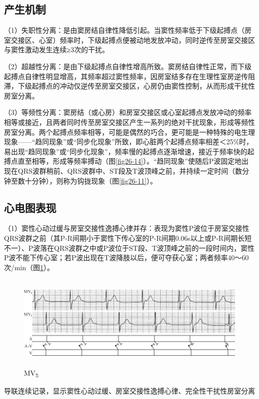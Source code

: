 \protect\hypertarget{text00033.htmlux5cux23subid404}{}{}

\subsection{产生机制}

（1）失职性分离：是由窦房结自律性降低引起。当窦性频率低于下级起搏点（房室交接区、心室）频率时，下级起搏点便被动地发放冲动，同时逆传至房室交接区与窦性激动发生连续≥3次的干扰。

（2）超越性分离：是由下级起搏点自律性增高所致。窦房结自律性正常，而下级起搏点自律性明显增高，其频率超过窦性频率，因房室结多存在生理性室房逆传阻滞，下级起搏点的冲动仅逆传至房室交接区，心房仍由窦性控制，从而形成干扰性房室分离。

（3）等频性分离：窦房结（或心房）和房室交接区或心室起搏点发放冲动的频率相等或接近，且两者同时传至房室交接区产生一系列的绝对干扰现象，形成等频性房室分离。两个起搏点频率相等，可能是偶然的巧合，更可能是一种特殊的电生理现象------“趋同现象”或“同步化现象”所致，即心脏两个起搏点频率相差＜25\%时，易出现“趋同现象”或“同步化现象”，频率慢的起搏点逐渐增速，接近于频率快的起搏点直至相等，形成等频率搏动（图\ref{fig26-14}）。“趋同现象”使随后P波固定地出现在QRS波群稍前、QRS波群中、ST段及T波顶峰之前，并持续一定时间（数分钟至数十分钟），则称为钩拢现象（图\ref{fig26-11}）。

\protect\hypertarget{text00033.htmlux5cux23subid405}{}{}

\subsection{心电图表现}

（1）窦性心动过缓与房室交接性逸搏心律并存：表现为窦性P波位于房室交接性QRS波群之前（其P-R间期小于窦性下传心室的P-R间期0.06s以上或P-R间期长短不一）、P波落在QRS波群之中或P波位于ST段、T波顶峰之前的一段时间内，窦性P波不能下传心室；若P波出现在T波降肢以后，便可夺获心室；两者频率40～60次/min（图\ref{fig26-10}）。

\begin{figure}[!htbp]
 \centering
 \includegraphics[width=5.80208in,height=1.8125in]{./images/Image00451.jpg}
 \captionsetup{justification=centering}
 \caption{MV\textsubscript{5}}
 \label{fig26-10}
  \end{figure} 
导联连续记录，显示窦性心动过缓、房室交接性逸搏心律、完全性干扰性房室分离

